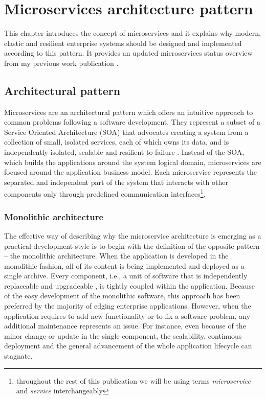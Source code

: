 \documentclass[oneside,
  digital, %
  table,   %
  lof,     %
  lot,     %
]{fithesis3}
\begin{document}
\clearpage
\chapter{Microservices architecture pattern}

This chapter introduces the concept of microservices and it explains why modern, elastic and resilient enterprise systems should be designed and implemented according to this pattern. It provides an updated microservices status overview from my previous work publication \cite{bachelor_thesis}.

\section{Architectural pattern}

Microservices are an architectural pattern which offers an intuitive approach to common problems following a software development. They represent a subset of a Service Oriented Architecture (SOA) \cite{soa} that advocates creating a system from a collection of small, isolated services, each of which owns its data, and is independently isolated, scalable and resilient to failure \cite{reactive_ms_arch}. Instead of the SOA, which builds the applications around the system logical domain, microservices are focused around the application business model. Each microservice represents the separated and independent part of the system that interacts with other components only through predefined communication interfaces\footnote{throughout the rest of this publication we will be using terms \textit{microservice} and \textit{service} interchangeably}.

\subsection{Monolithic architecture}

The effective way of describing why the microservice architecture is emerging as a practical development style is to begin with the definition of the opposite pattern -- the monolithic architecture. When the application is developed in the monolithic fashion, all of its content is being implemented and deployed as a single archive. Every component, i.e., a unit of software that is independently replaceable and upgradeable \cite{microservices}, is tightly coupled within the application. Because of the easy development of the monolithic software, this approach has been preferred by the majority of edging enterprise applications. However, when the application requires to add new functionality or to fix a software problem, any additional maintenance represents an issue. For instance, even because of the minor change or update in the single component, the scalability, continuous deployment and the general advancement of the whole application lifecycle can stagnate. 
\end{document}
